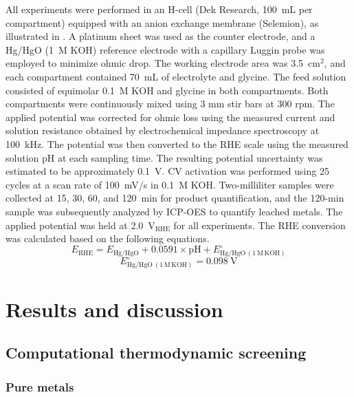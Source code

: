 \documentclass[twoside,twocolumn,9pt]{article}
\begin{document}
All experiments were performed in an H-cell (Dek Research, 100~mL per compartment) equipped with an anion exchange membrane (Selemion), as illustrated in . A platinum sheet was used as the counter electrode, and a Hg/HgO (1~M KOH) reference electrode with a capillary Luggin probe was employed to minimize ohmic drop. The working electrode area was 3.5~cm$^2$, and each compartment contained 70~mL of electrolyte and glycine. The feed solution consisted of equimolar 0.1~M KOH and glycine in both compartments. Both compartments were continuously mixed using 3 mm stir bars at 300 rpm. The applied potential was corrected for ohmic loss using the measured current and solution resistance obtained by electrochemical impedance spectroscopy at 100~kHz. The potential was then converted to the RHE scale using the measured solution pH at each sampling time. The resulting potential uncertainty was estimated to be approximately 0.1~V. CV activation was performed using 25 cycles at a scan rate of 100~mV/s in 0.1~M KOH. Two-milliliter samples were collected at 15, 30, 60, and 120~min for product quantification, and the 120-min sample was subsequently analyzed by ICP-OES to quantify leached metals. The applied potential was held at 2.0~V$_{\mathrm{RHE}}$ for all experiments. The RHE conversion was calculated based on the following equations. \[
E_{\mathrm{RHE}} = E_{\mathrm{Hg/HgO}} + 0.0591 \times \mathrm{pH} + E^\circ_{\mathrm{Hg/HgO}\,(1\,\mathrm{M\,KOH})}
\]
\[
E^\circ_{\mathrm{Hg/HgO}\,(1\,\mathrm{M\,KOH})} = 0.098~\mathrm{V}
\]


\section{Results and discussion}
\subsection{Computational thermodynamic screening} 
\label{sec:computational_screening} 
\subsubsection{Pure metals} 
\end{document}

